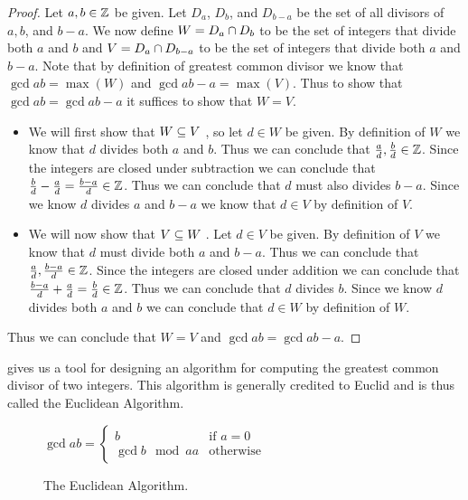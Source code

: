         \begin{proof}
            Let $a, b \in \mathbb{Z}$ be given. Let $D_a$, $D_b$,  and $D_{b - a}$ be the set of all divisors
            of $a, b$, and $b - a$. We now define $W = D_a \cap D_b$ to be the set of integers that
            divide both $a$ and $b$ and $V = D_a \cap D_{b - a}$ to be the set of integers that
            divide both $a$ and $b - a$. Note that by definition of greatest common divisor we know that
            $\gcd{a}{b} = \max(W)$ and $\gcd{a}{b - a} = \max(V)$. Thus to show that $\gcd{a}{b} =
            \gcd{a}{b - a}$ it suffices to show that $W = V$.
            \begin{itemize}
                \item
                    We will first show that $W \subseteq V \ $, so let $d \in W$ be given. By definition
                    of $W$ we know that $d$ divides both $a$ and $b$. Thus we can conclude that
                    $\frac{a}{d}, \frac{b}{d} \in \mathbb{Z}$. Since the integers are closed under subtraction
                    we can conclude that $\frac{b}{d} - \frac{a}{d} = \frac{b - a}{d} \in \mathbb{Z}$.
                    Thus we can conclude that $d$ must also divides $b - a$. Since we know $d$ divides
                    $a$ and $b - a$ we know that $d \in V$ by definition of $V$.
                \item
                    We will now show that $V \subseteq W \ $. Let $d \in V$ be given. By definition of $V$
                    we know that $d$ must divide both $a$ and $b - a$. Thus we can conclude that
                    $\frac{a}{d}, \frac{b - a}{d} \in \mathbb{Z}$. Since the integers are closed under
                    addition we can conclude that $\frac{b - a}{d} + \frac{a}{d} = \frac{b}{d} \in \mathbb{Z}$.
                    Thus we can conclude that $d$ divides $b$. Since we know $d$ divides both $a$
                    and $b$ we can conclude that $d \in W$ by definition of $W$.
            \end{itemize}
            Thus we can conclude that $W = V$ and $\gcd{a}{b} = \gcd{a}{b - a}$. \QED
        \end{proof}
        \begin{algorithm}
             gives us a tool for designing an algorithm for computing the greatest
            common divisor of two integers. This algorithm is generally credited to Euclid and is thus called
            the Euclidean Algorithm.
            \begin{figure}[H]
                \centering
                $\gcd{a}{b} = \left\{\begin{array}{ll}
                    b & \mbox{if } a = 0 \\
                    \gcd{b\mod a}{a} & \mbox{otherwise}
                \end{array}\right.$
                \caption{The Euclidean Algorithm.}
            \end{figure}
        \end{algorithm}
